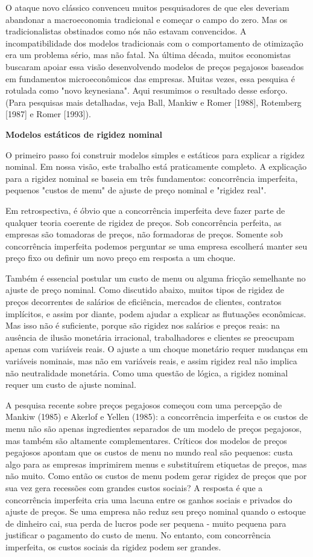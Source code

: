 \documentclass[12pt]{article}
\begin{document}
O ataque novo clássico convenceu muitos pesquisadores de que eles deveriam abandonar a macroeconomia tradicional e começar o campo do zero. Mas os tradicionalistas obstinados como nós não estavam convencidos. A incompatibilidade dos modelos tradicionais com o comportamento de otimização era um problema sério, mas não fatal. Na última década, muitos economistas buscaram apoiar essa visão desenvolvendo modelos de preços pegajosos baseados em fundamentos microeconômicos das empresas. Muitas vezes, essa pesquisa é rotulada como "novo keynesiana". Aqui resumimos o resultado desse esforço. (Para pesquisas mais detalhadas, veja Ball, Mankiw e Romer [1988], Rotemberg [1987] e Romer [1993]).

\textbf{Modelos estáticos de rigidez nominal}

O primeiro passo foi construir modelos simples e estáticos para explicar a rigidez nominal. Em nossa visão, este trabalho está praticamente completo. A explicação para a rigidez nominal se baseia em três fundamentos: concorrência imperfeita, pequenos "custos de menu" de ajuste de preço nominal e "rigidez real".

Em retrospectiva, é óbvio que a concorrência imperfeita deve fazer parte de qualquer teoria coerente de rigidez de preços. Sob concorrência perfeita, as empresas são tomadoras de preços, não formadoras de preços. Somente sob concorrência imperfeita podemos perguntar se uma empresa escolherá manter seu preço fixo ou definir um novo preço em resposta a um choque.

Também é essencial postular um custo de menu ou alguma fricção semelhante no ajuste de preço nominal. Como discutido abaixo, muitos tipos de rigidez de preços decorrentes de salários de eficiência, mercados de clientes, contratos implícitos, e assim por diante, podem ajudar a explicar as flutuações econômicas. Mas isso não é suficiente, porque são rigidez nos salários e preços reais: na ausência de ilusão monetária irracional, trabalhadores e clientes se preocupam apenas com variáveis reais. O ajuste a um choque monetário requer mudanças em variáveis nominais, mas não em variáveis reais, e assim rigidez real não implica não neutralidade monetária. Como uma questão de lógica, a rigidez nominal requer um custo de ajuste nominal.

A pesquisa recente sobre preços pegajosos começou com uma percepção de Mankiw (1985) e Akerlof e Yellen (1985): a concorrência imperfeita e os custos de menu não são apenas ingredientes separados de um modelo de preços pegajosos, mas também são altamente complementares. Críticos dos modelos de preços pegajosos apontam que os custos de menu no mundo real são pequenos: custa algo para as empresas imprimirem menus e substituírem etiquetas de preços, mas não muito. Como então os custos de menu podem gerar rigidez de preços que por sua vez gera recessões com grandes custos sociais? A resposta é que a concorrência imperfeita cria uma lacuna entre os ganhos sociais e privados do ajuste de preços. Se uma empresa não reduz seu preço nominal quando o estoque de dinheiro cai, sua perda de lucros pode ser pequena - muito pequena para justificar o pagamento do custo de menu. No entanto, com concorrência imperfeita, os custos sociais da rigidez podem ser grandes.
\end{document}

